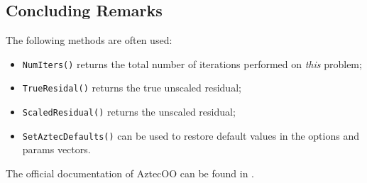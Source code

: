 
\subsection{Concluding Remarks}

The following methods are often used:
\begin{itemize}
\item \verb!NumIters()! returns the total number of iterations performed
  on {\sl this} problem;
\item \verb!TrueResidal()! returns the true unscaled residual;
\item \verb!ScaledResidual()! returns the unscaled residual;
\item \verb!SetAztecDefaults()! can be used to restore default values in
  the options and params vectors.
\end{itemize}

The official documentation of AztecOO can be found in
\cite{AztecOO-Users-Guide}.

